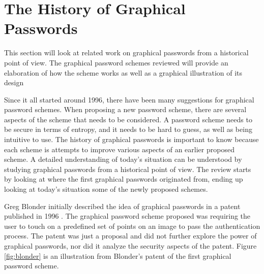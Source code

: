 \section{The History of Graphical Passwords} \label{sec:historygraphicalpasswords}
	 
  This section will look at related work on graphical passwords from a historical point of view. The graphical password schemes reviewed will provide an elaboration of how the scheme works as well as a graphical illustration of its design

  Since it all started around 1996, there have been many suggestions for graphical password schemes. When proposing a new password scheme, there are several aspects of the scheme that needs to be considered. A password scheme needs to be secure in terms of entropy, and it needs to be hard to guess, as well as being intuitive to use. The history of graphical passwords is important to know because each scheme is attempts to improve various aspects of an earlier proposed scheme. A detailed understanding of today's situation can be understood by studying graphical passwords from a historical point of view. The review starts by looking at where the first graphical passwords originated from, ending up looking at today's situation some of the newly proposed schemes.

  Greg Blonder initially described the idea of graphical passwords in a patent published in 1996 \cite{Blonder}. The graphical password scheme proposed was requiring the user to touch on a predefined set of points on an image to pass the authentication process. The patent was just a proposal and did not further explore the power of graphical passwords, nor did it analyze the security aspects of the patent. Figure \ref{fig:blonder} is an illustration from Blonder's patent of the first graphical password scheme.

